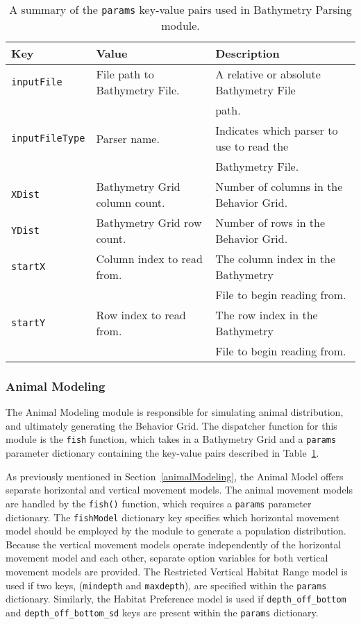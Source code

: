 \begin{table}[ht]
	\begin{tabular}{l l l}
		Key						&	Value 								&	Description\\
		\hline
		\texttt{inputFile}		& 	File path to Bathymetry File.		&	A relative or absolute Bathymetry File\\
								&										&	path.\\
		\texttt{inputFileType}	& 	Parser name.						&	Indicates which parser to use to read the \\
								&										&	Bathymetry File.\\
		\texttt{XDist}			&	Bathymetry Grid column count.			&	Number of columns in the Behavior Grid.\\
		\texttt{YDist}			&	Bathymetry Grid row count.			&	Number of rows in the Behavior 	Grid.\\		
		\texttt{startX}			& 	Column index to read from. 			& 	The column index in the Bathymetry\\
								&										&   File to	begin reading from.\\
		\texttt{startY}			& 	Row index to read from.				&	The row index in the Bathymetry\\
								&										&	File to begin reading from.\\
	\end{tabular}
	\caption{A summary of the \texttt{params} key-value pairs used in Bathymetry Parsing module.
		\label{bathyParams}}
\end{table}

\subsubsection{Animal Modeling}
	
The Animal Modeling module is responsible for simulating animal distribution, and ultimately generating the Behavior Grid.  The dispatcher function for this module is the \texttt{fish} function, which takes in a Bathymetry Grid and a \texttt{params} parameter dictionary containing the key-value pairs described in Table~\ref{bathyParams}.

As previously mentioned in Section~\ref{animalModeling}, the Animal Model offers separate horizontal and vertical movement models.  The animal movement models are handled by the \texttt{fish()} function, which requires a \texttt{params} parameter dictionary.  The \texttt{fishModel} dictionary key specifies which horizontal movement model should be employed by the module to generate a population distribution.  Because the vertical movement models operate independently of the horizontal movement model and each other, separate option variables for both vertical movement models are provided.  The Restricted Vertical Habitat Range model is used if two keys, (\texttt{mindepth} and \texttt{maxdepth}), are specified within the \texttt{params} dictionary.  Similarly, the Habitat Preference model is used if \texttt{depth\_off\_bottom} and \texttt{depth\_off\_bottom\_sd} keys are present within the \texttt{params} dictionary.  

